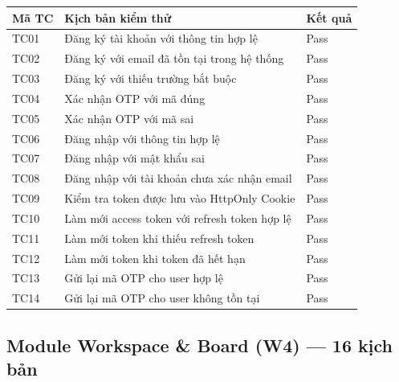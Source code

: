 \begin{table}[H]
\centering
\begin{tabularx}{\textwidth}{|l|X|l|}
\hline
\rowcolor{gray!20}
\textbf{Mã TC} & \textbf{Kịch bản kiểm thử} & \textbf{Kết quả} \\
\hline
TC01 & Đăng ký tài khoản với thông tin hợp lệ & Pass \\
\hline
TC02 & Đăng ký với email đã tồn tại trong hệ thống & Pass \\
\hline
TC03 & Đăng ký với thiếu trường bắt buộc & Pass \\
\hline
TC04 & Xác nhận OTP với mã đúng & Pass \\
\hline
TC05 & Xác nhận OTP với mã sai & Pass \\
\hline
TC06 & Đăng nhập với thông tin hợp lệ & Pass \\
\hline
TC07 & Đăng nhập với mật khẩu sai & Pass \\
\hline
TC08 & Đăng nhập với tài khoản chưa xác nhận email & Pass \\
\hline
TC09 & Kiểm tra token được lưu vào HttpOnly Cookie & Pass \\
\hline
TC10 & Làm mới access token với refresh token hợp lệ & Pass \\
\hline
TC11 & Làm mới token khi thiếu refresh token & Pass \\
\hline
TC12 & Làm mới token khi token đã hết hạn & Pass \\
\hline
TC13 & Gửi lại mã OTP cho user hợp lệ & Pass \\
\hline
TC14 & Gửi lại mã OTP cho user không tồn tại & Pass \\
\hline
\end{tabularx}
\end{table}

\subsection*{Module Workspace \& Board (W4) — 16 kịch bản}

